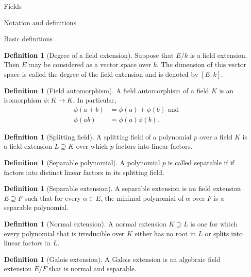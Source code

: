 \documentclass{article}
\theoremstyle{definition}
\numberwithin{theorem}{subsection} %
\theoremstyle{definition}
\newtheorem{definition}[paragraph]{Definition}
\newcommand{\fn}[3]{{#1 \colon #2 \rightarrow #3}}
\begin{document}
\begin{section}{Fields}
  \begin{subsection}{Notation and definitions}
    \begin{subsubsection}{Basic definitions}
      \begin{definition}[Degree of a field extension]
        Suppose that $E/k$ is a field extension. Then $E$ may be considered as a
        vector space over $k$. The dimension of this vector space is called
        the degree of the field extension and is denoted by $[E:k]$.
      \end{definition}
      \begin{definition}[Field automorphism]
        A field automorphism of a field $K$ is an isomorphism $\fn \phi K K$.
        In particular, \begin{align*}
          \phi(a + b) &= \phi(a) + \phi(b) \text{ and}\\
          \phi(ab) &= \phi(a)\phi(b).
        \end{align*}
      \end{definition}
      \begin{definition}[Splitting field]
        A splitting field of a polynomial $p$ over a field $K$ is a field
        extension $L \supseteq K$ over which $p$ factors into linear factors.
      \end{definition}
      \begin{definition}[Separable polynomial]
        A polynomial $p$ is called separable if if factors into distinct linear
        factors in its splitting field.
      \end{definition}
      \begin{definition}[Separable extension]
        A separable extension is an field extension $E \supseteq F$ such that
        for every $\alpha \in E$, the minimal polynomial of $\alpha$ over $F$ is
        a separable polynomial.
      \end{definition}
      \begin{definition}[Normal extension]
        A normal extension $K \supseteq L$ is one for which every polynomial that
        is irreducible over $K$ either has no root in $L$ or splits into linear
        factors in $L$.
      \end{definition}
      \begin{definition}[Galois extension]
        A Galois extension is an algebraic field extension $E/F$ that is normal
        and separable.
      \end{definition}

\end{subsubsection}
\end{subsection}
\end{section}
\end{document}
